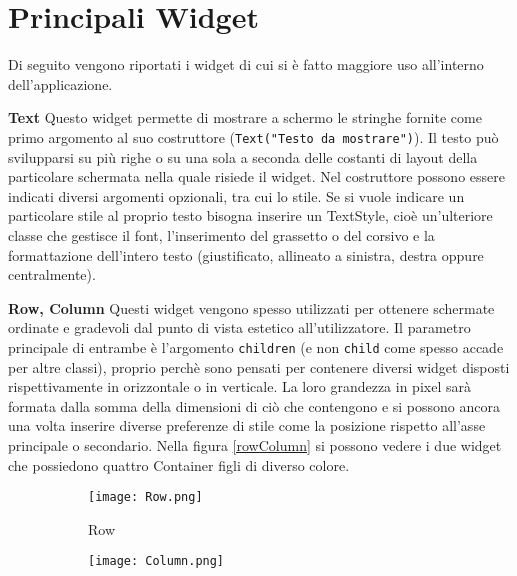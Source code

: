 	\section{Principali Widget}
	Di seguito vengono riportati i widget di cui si è fatto maggiore uso
	all'interno dell'applicazione.
	
	\begin{trivlist}
		\item \textbf{Text} \newline
		Questo widget permette di mostrare a schermo le stringhe fornite come
		primo argomento al suo costruttore (\verb|Text("Testo da mostrare")|).
		Il testo può svilupparsi su più righe o su una sola a seconda delle
		costanti di layout della particolare schermata nella quale risiede il
		widget. Nel costruttore possono essere indicati diversi argomenti
		opzionali, tra cui lo stile. Se si vuole indicare un particolare stile
		al proprio testo bisogna inserire un TextStyle, cioè un'ulteriore classe
		che gestisce il font, l'inserimento del grassetto o del corsivo e la
		formattazione dell'intero testo (giustificato, allineato a sinistra,
		destra oppure centralmente).  
		\item \textbf{Row, Column} \newline
		Questi widget vengono spesso utilizzati per ottenere schermate ordinate
		e gradevoli dal punto di vista estetico all'utilizzatore. Il parametro
		principale di entrambe è l'argomento \verb|children| (e non \verb|child| come
		spesso accade per altre classi), proprio perchè sono pensati per
		contenere diversi widget disposti rispettivamente in orizzontale o in
		verticale. La loro grandezza in pixel sarà formata dalla somma della
		dimensioni di ciò che contengono e si possono ancora una volta inserire diverse
		preferenze di stile come la posizione rispetto all'asse principale o
		secondario. Nella figura \ref{rowColumn} si possono vedere i due widget
		che possiedono quattro Container figli di diverso colore.
		\begin{figure}[h!]
			\centering
			\begin{subfigure}{0.3\linewidth}
				\texttt{[image: Row.png]}
				\caption{Row}
			\end{subfigure}
			\begin{subfigure}{0.3\linewidth}
				\texttt{[image: Column.png]}

\end{subfigure}
\end{figure}
\end{trivlist}
